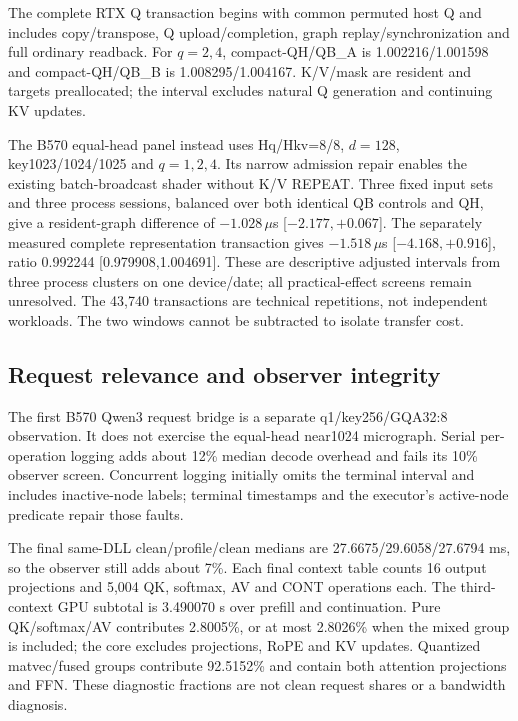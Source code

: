 The complete RTX Q transaction begins with common permuted host Q and includes copy/transpose, Q upload/completion, graph replay/synchronization and full ordinary readback. For $q=2,4$, compact-QH/QB\_A is 1.002216/1.001598 and compact-QH/QB\_B is 1.008295/1.004167. K/V/mask are resident and targets preallocated; the interval excludes natural Q generation and continuing KV updates.

The B570 equal-head panel instead uses Hq/Hkv=8/8, $d=128$, key1023/1024/1025 and $q=1,2,4$. Its narrow admission repair enables the existing batch-broadcast shader without K/V REPEAT. Three fixed input sets and three process sessions, balanced over both identical QB controls and QH, give a resident-graph difference of $-1.028\,\mu$s [$-2.177,+0.067$]. The separately measured complete representation transaction gives $-1.518\,\mu$s [$-4.168,+0.916$], ratio 0.992244 [0.979908,1.004691]. These are descriptive adjusted intervals from three process clusters on one device/date; all practical-effect screens remain unresolved. The 43,740 transactions are technical repetitions, not independent workloads. The two windows cannot be subtracted to isolate transfer cost.

\subsection{Request relevance and observer integrity}
The first B570 Qwen3 request bridge is a separate q1/key256/GQA32:8 observation. It does not exercise the equal-head near1024 micrograph. Serial per-operation logging adds about 12\% median decode overhead and fails its 10\% observer screen. Concurrent logging initially omits the terminal interval and includes inactive-node labels; terminal timestamps and the executor's active-node predicate repair those faults.

The final same-DLL clean/profile/clean medians are 27.6675/29.6058/27.6794 ms, so the observer still adds about 7\%. Each final context table counts 16 output projections and 5,004 QK, softmax, AV and CONT operations each. The third-context GPU subtotal is 3.490070 s over prefill and continuation. Pure QK/softmax/AV contributes 2.8005\%, or at most 2.8026\% when the mixed group is included; the core excludes projections, RoPE and KV updates. Quantized matvec/fused groups contribute 92.5152\% and contain both attention projections and FFN. These diagnostic fractions are not clean request shares or a bandwidth diagnosis.
